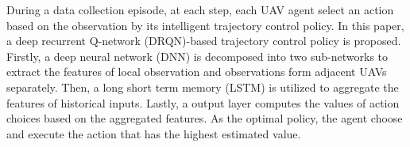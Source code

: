 \documentclass[journal]{IEEEtran}
\begin{document}
During a data collection episode, at each step, each UAV agent select an action based on the observation by its intelligent trajectory control policy. In this paper, a deep recurrent Q-network (DRQN)-based trajectory control policy is proposed. Firstly, a deep neural network (DNN) is decomposed into two sub-networks to extract the features of local observation and observations form adjacent UAVs separately. Then, a long short term memory (LSTM) is utilized to aggregate the features of historical inputs. Lastly, a output layer computes the values of action choices based on the aggregated features. As the optimal policy, the agent choose and execute the action that has the highest estimated value. 
\end{document}
